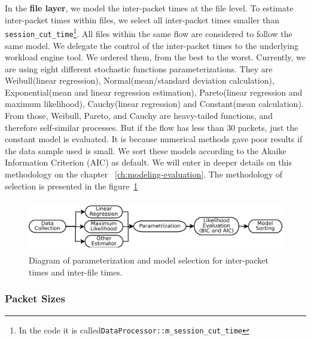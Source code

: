 In the \textbf{file layer}, we model the inter-packet times at the file level. To estimate inter-packet times within files, we select all inter-packet times smaller than \texttt{session\_cut\_time}\footnote{In the code it is called\texttt{DataProcessor::m\_session\_cut\_time} }. All files within the same flow are considered to follow the same model. We delegate the control of the inter-packet times to the underlying workload engine tool. We ordered them, from the best to the worst. Currently, we are using eight different stochastic functions parameterizations. They are Weibull(linear regression), Normal(mean/standard deviation calculation), Exponential(mean and linear regression estimation), Pareto(linear regression and maximum likelihood), Cauchy(linear regression) and Constant(mean calculation). From those, Weibull, Pareto, and Cauchy are heavy-tailed functions, and therefore self-similar processes. But if the flow has less than 30 packets, just the constant model is evaluated. It is because numerical methods gave poor results if the data sample used is small. We sort these models according to the Akaike Information Criterion (AIC) as default\cite{sourcesonoff-paper}\cite{bic-aic-comparision}. We will enter in deeper details on this methodology on the chapter ~\ref{ch:modeling-evaluation}. The methodology of selection is presented in the figure~\ref{fig:model-parameterization}

\begin{figure}[ht!]
    \centering
    \includegraphics[height=0.9in]{figures/ch3/simitar-parametrization}
    \caption{Diagram of parameterization and model selection for inter-packet times and inter-file times.}
    \label{fig:model-parameterization}
\end{figure}


\subsubsection{Packet Sizes}

